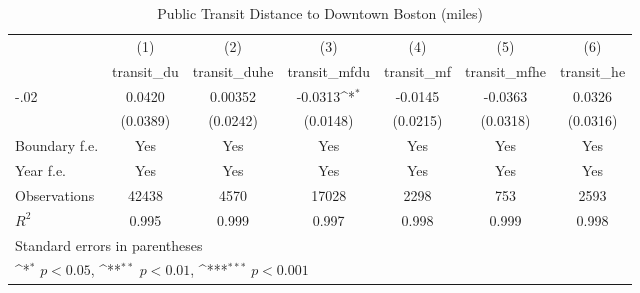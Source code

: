 \begin{table}[htbp]\centering
\def\sym#1{\ifmmode^{#1}\else\(^{#1}\)\fi}
\caption{Public Transit Distance to Downtown Boston (miles)}
\begin{tabular}{l*{6}{c}}
\hline\hline
                    &\multicolumn{1}{c}{(1)}&\multicolumn{1}{c}{(2)}&\multicolumn{1}{c}{(3)}&\multicolumn{1}{c}{(4)}&\multicolumn{1}{c}{(5)}&\multicolumn{1}{c}{(6)}\\
                    &\multicolumn{1}{c}{transit\_du}&\multicolumn{1}{c}{transit\_duhe}&\multicolumn{1}{c}{transit\_mfdu}&\multicolumn{1}{c}{transit\_mf}&\multicolumn{1}{c}{transit\_mfhe}&\multicolumn{1}{c}{transit\_he}\\
\hline
-.02                &      0.0420         &     0.00352         &     -0.0313\sym{*}  &     -0.0145         &     -0.0363         &      0.0326         \\
                    &    (0.0389)         &    (0.0242)         &    (0.0148)         &    (0.0215)         &    (0.0318)         &    (0.0316)         \\
[1em]
Boundary f.e.       &         Yes         &         Yes         &         Yes         &         Yes         &         Yes         &         Yes         \\
[1em]
Year f.e.           &         Yes         &         Yes         &         Yes         &         Yes         &         Yes         &         Yes         \\
\hline
Observations        &       42438         &        4570         &       17028         &        2298         &         753         &        2593         \\
\(R^{2}\)           &       0.995         &       0.999         &       0.997         &       0.998         &       0.999         &       0.998         \\
\hline\hline
\multicolumn{7}{l}{\footnotesize Standard errors in parentheses}\\
\multicolumn{7}{l}{\footnotesize \sym{*} \(p<0.05\), \sym{**} \(p<0.01\), \sym{***} \(p<0.001\)}\\
\end{tabular}
\end{table}
